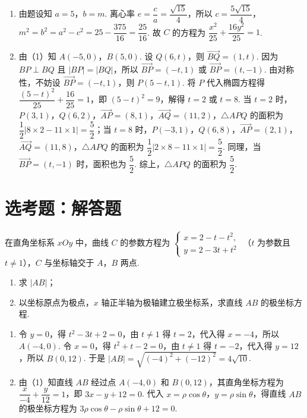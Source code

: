 \begin{solution}
\begin{enumerate}
    \item 由题设知 \(a=5\)，\(b=m\). 离心率 \(e=\dfrac ca=\dfrac{\sqrt{15}}{4}\)，所以 \(c=\dfrac{5\sqrt{15}}{4}\)，\(m^2=b^2=a^2-c^2=25-\dfrac{375}{16}=\dfrac{25}{16}\). 故 \(C\) 的方程为 \(\dfrac{x^2}{25}+\dfrac{16y^2}{25}=1\).
    \item 由（1）知 \(A(-5,0)\)，\(B(5,0)\). 设 \(Q(6,t)\)，则 \(\overrightarrow{BQ}=(1,t)\). 因为 \(BP\perp BQ\) 且 \(|BP|=|BQ|\)，所以 \(\overrightarrow{BP}=(-t,1)\) 或 \(\overrightarrow{BP}=(t,-1)\). 由对称性，不妨设 \(\overrightarrow{BP}=(-t,1)\)，则 \(P(5-t,1)\). 将 \(P\) 代入椭圆方程得 \(\dfrac{(5-t)^2}{25}+\dfrac{16}{25}=1\)，即 \((5-t)^2=9\)，解得 \(t=2\) 或 \(t=8\). 当 \(t=2\) 时，\(P(3,1)\)，\(Q(6,2)\)，\(\overrightarrow{AP}=(8,1)\)，\(\overrightarrow{AQ}=(11,2)\)，\(\triangle APQ\) 的面积为 \(\dfrac12|8\times2-11\times1|=\dfrac52\)；当 \(t=8\) 时，\(P(-3,1)\)，\(Q(6,8)\)，\(\overrightarrow{AP}=(2,1)\)，\(\overrightarrow{AQ}=(11,8)\)，\(\triangle APQ\) 的面积为 \(\dfrac12|2\times8-11\times1|=\dfrac52\). 同理，当 \(\overrightarrow{BP}=(t,-1)\) 时，面积也为 \(\dfrac52\). 综上，\(\triangle APQ\) 的面积为 \(\dfrac52\).
\end{enumerate}
\end{solution}

\section{选考题：解答题}

\begin{problem}
在直角坐标系 \(xOy\) 中，曲线 \(C\) 的参数方程为
\(\begin{cases}
x=2-t-t^2,\\
y=2-3t+t^2
\end{cases}\)
（\(t\) 为参数且 \(t\neq 1\)），\(C\) 与坐标轴交于 \(A\)，\(B\) 两点.

\begin{enumerate}
    \item 求 \(|AB|\)；
    \item 以坐标原点为极点，\(x\) 轴正半轴为极轴建立极坐标系，求直线 \(AB\) 的极坐标方程.
\end{enumerate}
\end{problem}

\begin{solution}
\begin{enumerate}
    \item 令 \(y=0\)，得 \(t^2-3t+2=0\)，由 \(t\ne1\) 得 \(t=2\)，代入得 \(x=-4\)，所以 \(A(-4,0)\). 令 \(x=0\)，得 \(t^2+t-2=0\)，由 \(t\ne1\) 得 \(t=-2\)，代入得 \(y=12\)，所以 \(B(0,12)\). 于是 \(|AB|=\sqrt{(-4)^2+(-12)^2}=4\sqrt{10}\).
    \item 由（1）知直线 \(AB\) 经过点 \(A(-4,0)\) 和 \(B(0,12)\)，其直角坐标方程为 \(\dfrac{x}{-4}+\dfrac{y}{12}=1\)，即 \(3x-y+12=0\). 代入 \(x=\rho\cos\theta\)，\(y=\rho\sin\theta\)，得直线 \(AB\) 的极坐标方程为 \(3\rho\cos\theta-\rho\sin\theta+12=0\).
\end{enumerate}
\end{solution}

